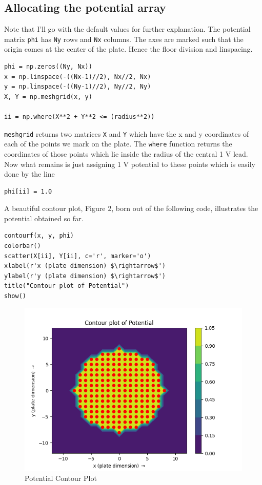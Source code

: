 \documentclass[11pt, a4paper]{article}
\begin{document}
\subsection{Allocating the potential array}
Note that I'll go with the default values for further explanation. The potential matrix \texttt{phi} has \texttt{Ny} rows and \texttt{Nx} columns. The axes are marked such that the origin comes at the center of the plate. Hence the floor division and linspacing. 
\begin{verbatim}
phi = np.zeros((Ny, Nx))
x = np.linspace(-((Nx-1)//2), Nx//2, Nx)
y = np.linspace(-((Ny-1)//2), Ny//2, Ny)
X, Y = np.meshgrid(x, y)

ii = np.where(X**2 + Y**2 <= (radius**2))
\end{verbatim}

\texttt{meshgrid} returns two matrices \texttt{X} and \texttt{Y} which have the x and y coordinates of each of the points we mark on the plate. The \texttt{where} function returns the coordinates of those points which lie inside the radius of the central 1 V lead. Now what remains is just assigning 1 V potential to these points which is easily done by the line
\begin{verbatim}
phi[ii] = 1.0
\end{verbatim}  

A beautiful contour plot, Figure 2, born out of the following code,  illustrates the potential obtained so far.  

\begin{verbatim}
contourf(x, y, phi)  
colorbar()
scatter(X[ii], Y[ii], c='r', marker='o')
xlabel(r'x (plate dimension) $\rightarrow$')
ylabel(r'y (plate dimension) $\rightarrow$')
title("Contour plot of Potential")
show()
\end{verbatim}

\begin{figure}[!tbh]
   	\centering
  \includegraphics[scale=0.5]{Q1.png} 
    \caption{Potential Contour Plot}
   	\label{fig:contour potential)}
   \end{figure}
   
\end{document}
